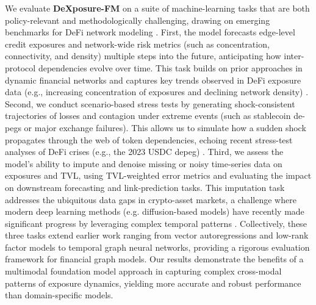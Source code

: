 We evaluate \textbf{DeXposure-FM} on a suite of machine-learning tasks that are both policy-relevant and methodologically challenging, drawing on emerging benchmarks for DeFi network modeling \cite{DeXposure2025}. First, the model forecasts edge-level credit exposures and network-wide risk metrics (such as concentration, connectivity, and density) multiple steps into the future, anticipating how inter-protocol dependencies evolve over time. This task builds on prior approaches in dynamic financial networks and captures key trends observed in DeFi exposure data (e.g., increasing concentration of exposures and declining network density) \cite{DeXposure2025}. Second, we conduct scenario-based stress tests by generating shock-consistent trajectories of losses and contagion under extreme events (such as stablecoin de-pegs or major exchange failures). This allows us to simulate how a sudden shock propagates through the web of token dependencies, echoing recent stress-test analyses of DeFi crises (e.g., the 2023 USDC depeg) \cite{Shah2025}. Third, we assess the model’s ability to impute and denoise missing or noisy time-series data on exposures and TVL, using TVL-weighted error metrics and evaluating the impact on downstream forecasting and link-prediction tasks. This imputation task addresses the ubiquitous data gaps in crypto-asset markets, a challenge where modern deep learning methods (e.g. diffusion-based models) have recently made significant progress by leveraging complex temporal patterns \cite{Wang2025ImputeSurvey}. Collectively, these three tasks extend earlier work ranging from vector autoregressions and low-rank factor models to temporal graph neural networks, providing a rigorous evaluation framework for financial graph models. Our results demonstrate the benefits of a multimodal foundation model approach in capturing complex cross-modal patterns of exposure dynamics, yielding more accurate and robust performance than domain-specific models.

